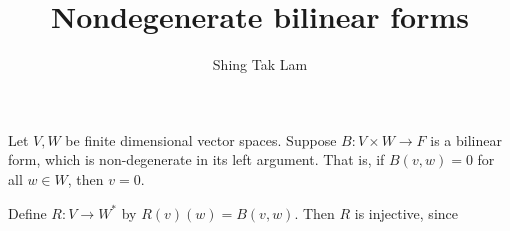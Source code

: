 \documentclass{article}
\title{Nondegenerate bilinear forms}
\author{Shing Tak Lam}
\begin{document}
\maketitle

Let \(V, W\) be finite dimensional vector spaces. Suppose \(B : V \times W \to F\) is a bilinear form, which is non-degenerate in its left argument. That is, if \(B(v, w) = 0\) for all \(w \in W\), then \(v = 0\).

Define \(R : V \to W^*\) by \(R(v)(w) = B(v, w)\). Then \(R\) is injective, since 
\end{document}
